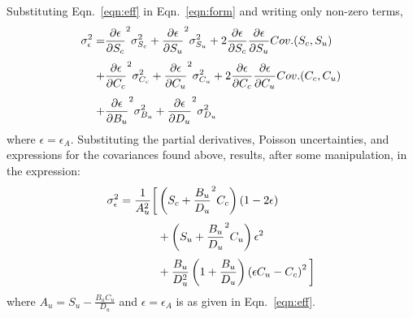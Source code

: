 Substituting Eqn.~\ref{eqn:eff} in Eqn.~\ref{eqn:form} and writing only non-zero terms,
\begin{equation}
\openup 1\jot
\begin{split}
\sigma_{\epsilon}^2 =  &\frac{\partial \epsilon}{\partial S_c}^2 \sigma_{S_c}^2 + \frac{\partial \epsilon}{\partial S_u}^2 \sigma_{S_u}^2 + 2 \frac{\partial \epsilon}{\partial S_c} \frac{\partial \epsilon}{\partial S_u} Cov.(S_c, S_u) \\
                                       + &\frac{\partial \epsilon}{\partial C_c}^2 \sigma_{C_c}^2 + \frac{\partial \epsilon}{\partial C_u}^2 \sigma_{C_u}^2 + 2 \frac{\partial \epsilon}{\partial C_c} \frac{\partial \epsilon}{\partial C_u} Cov.(C_c, C_u) \\
                                       + &\frac{\partial \epsilon}{\partial B_u}^2 \sigma_{B_u}^2 + \frac{\partial \epsilon}{\partial D_u}^2 \sigma_{D_u}^2
\end{split}
\end{equation}
where $\epsilon = \epsilon_A$. Substituting the partial derivatives, Poisson uncertainties, and expressions for the covariances found above, results, after some manipulation, in the expression:
\begin{equation}
\openup 1\jot
\begin{split}
\sigma_{\epsilon}^2  = \frac{1}{A_u^2} \bigg[ & \left( S_c + \frac{B_u}{D_u}^2 C_c \right) \left(1 -2 \epsilon \right) \\
                                                                     & + \left( S_u + \frac{B_u}{D_u}^2 C_u \right) \epsilon^2  \\
                                                                     & + \frac{B_u}{D_u^2} \left( 1+ \frac{B_u}{D_u} \right) \left (\epsilon C_u - C_c \right)^2 \bigg]
\end{split}
\end{equation}
where $A_u = S_u - \frac{B_u C_u}{D_u}$ and $\epsilon = \epsilon_A$ is as given in Eqn.~\ref{eqn:eff}.                                                                     
